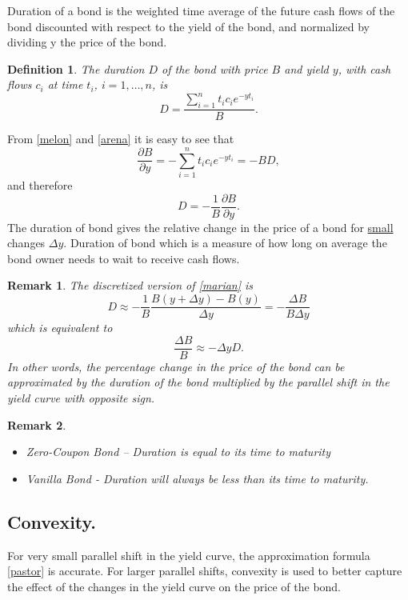 \documentclass{book}
\newtheorem{definition}{Definition}[section]
\newtheorem{remark}{Remark}[section]
\begin{document}
Duration of a bond is the weighted time average of the future cash flows of the bond discounted with respect to the yield of the bond, and normalized by dividing y the price of the bond.
\begin{definition}
The duration $D$ of the bond with price $B$ and yield $y$, with cash flows $c_{i}$ at time $t_{i}$, $i=1,\dots,n$, is
\begin{equation}
\label{arena}
D=\frac{\sum_{i=1}^{n}t_{i}c_{i}e^{-y t_{i}}}{B}.
\end{equation}
\end{definition}
From \eqref{melon} and \eqref{arena} it is easy to see that
$$
\frac{\partial B}{\partial y}=-\sum_{i=1}^{n}t_{i}c_{i}e^{-y t_{i}}=-B D,
$$
and therefore
\begin{equation}
\label{marian}
D=-\frac{1}{B}\frac{\partial B}{\partial y}.
\end{equation}
The duration of bond gives the relative change in the price of a bond for \underline{small} changes $\Delta y$. Duration of bond which is a measure of how long on average the bond owner needs to wait to receive cash flows.
\begin{remark}
The discretized version of \eqref{marian} is
$$
D\approx-\frac{1}{B}\frac{B(y+\Delta y)-B(y)}{\Delta y}=-\frac{\Delta B}{B \Delta y}
$$
which is equivalent to 
\begin{equation}
\label{pastor}
\frac{\Delta B}{B}\approx -\Delta y D.
\end{equation}
In other words, the percentage change in the price of the bond can be approximated by the duration of the bond multiplied by the parallel shift in the yield curve with opposite sign.
\end{remark}
\begin{remark}
\begin{itemize}
\item Zero-Coupon Bond – Duration is equal to its time to maturity
\item Vanilla Bond - Duration will always be less than its time to maturity.
\end{itemize}
\end{remark}
\subsection{Convexity.}
For very small parallel shift in the yield curve, the approximation formula \eqref{pastor} is accurate. For larger parallel shifts, convexity is used to better capture the effect of the changes in the yield curve on the price of the bond.
\end{document}
